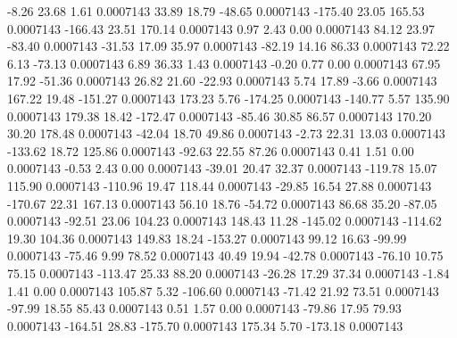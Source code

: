        -8.26       23.68        1.61     0.0007143
       33.89       18.79      -48.65     0.0007143
     -175.40       23.05      165.53     0.0007143
     -166.43       23.51      170.14     0.0007143
        0.97        2.43        0.00     0.0007143
       84.12       23.97      -83.40     0.0007143
      -31.53       17.09       35.97     0.0007143
      -82.19       14.16       86.33     0.0007143
       72.22        6.13      -73.13     0.0007143
        6.89       36.33        1.43     0.0007143
       -0.20        0.77        0.00     0.0007143
       67.95       17.92      -51.36     0.0007143
       26.82       21.60      -22.93     0.0007143
        5.74       17.89       -3.66     0.0007143
      167.22       19.48     -151.27     0.0007143
      173.23        5.76     -174.25     0.0007143
     -140.77        5.57      135.90     0.0007143
      179.38       18.42     -172.47     0.0007143
      -85.46       30.85       86.57     0.0007143
      170.20       30.20      178.48     0.0007143
      -42.04       18.70       49.86     0.0007143
       -2.73       22.31       13.03     0.0007143
     -133.62       18.72      125.86     0.0007143
      -92.63       22.55       87.26     0.0007143
        0.41        1.51        0.00     0.0007143
       -0.53        2.43        0.00     0.0007143
      -39.01       20.47       32.37     0.0007143
     -119.78       15.07      115.90     0.0007143
     -110.96       19.47      118.44     0.0007143
      -29.85       16.54       27.88     0.0007143
     -170.67       22.31      167.13     0.0007143
       56.10       18.76      -54.72     0.0007143
       86.68       35.20      -87.05     0.0007143
      -92.51       23.06      104.23     0.0007143
      148.43       11.28     -145.02     0.0007143
     -114.62       19.30      104.36     0.0007143
      149.83       18.24     -153.27     0.0007143
       99.12       16.63      -99.99     0.0007143
      -75.46        9.99       78.52     0.0007143
       40.49       19.94      -42.78     0.0007143
      -76.10       10.75       75.15     0.0007143
     -113.47       25.33       88.20     0.0007143
      -26.28       17.29       37.34     0.0007143
       -1.84        1.41        0.00     0.0007143
      105.87        5.32     -106.60     0.0007143
      -71.42       21.92       73.51     0.0007143
      -97.99       18.55       85.43     0.0007143
        0.51        1.57        0.00     0.0007143
      -79.86       17.95       79.93     0.0007143
     -164.51       28.83     -175.70     0.0007143
      175.34        5.70     -173.18     0.0007143
